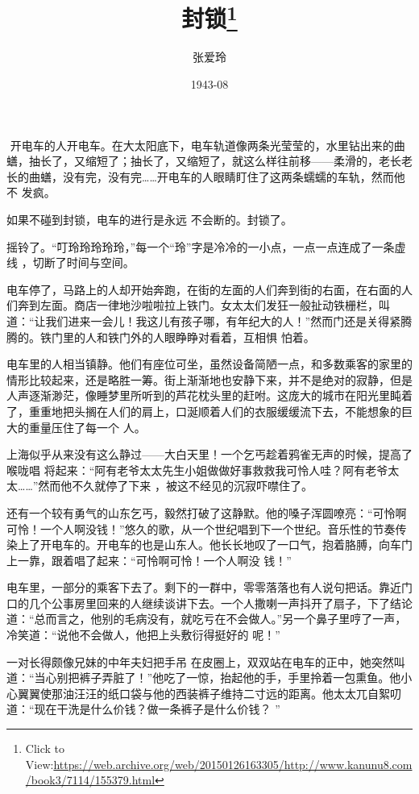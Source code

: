 \documentclass{article}
\title{封锁\footnote{Click to View:\url{https://web.archive.org/web/20150126163305/http://www.kanunu8.com/book3/7114/155379.html}}}
\author{张爱玲}
\date{1943-08}
\begin{document}

\maketitle


\Large

﻿	
    开电车的人开电车。在大太阳底下，电车轨道像两条光莹莹的，水里钻出来的曲蟮，抽长了，又缩短了；抽长了，又缩短了，就这么样往前移——柔滑的，老长老长的曲蟮，没有完，没有完……开电车的人眼睛盯住了这两条蠕蠕的车轨，然而他不
发疯。 

    如果不碰到封锁，电车的进行是永远
不会断的。封锁了。 

    摇铃了。“叮玲玲玲玲玲，”每一个“玲”字是冷冷的一小点，一点一点连成了一条虚线
，切断了时间与空间。 

\newpage

    电车停了，马路上的人却开始奔跑，在街的左面的人们奔到街的右面，在右面的人们奔到左面。商店一律地沙啦啦拉上铁门。女太太们发狂一般扯动铁栅栏，叫道：“让我们进来一会儿！我这儿有孩子哪，有年纪大的人！”然而门还是关得紧腾腾的。铁门里的人和铁门外的人眼睁睁对看着，互相惧
怕着。 

    电车里的人相当镇静。他们有座位可坐，虽然设备简陋一点，和多数乘客的家里的情形比较起来，还是略胜一筹。街上渐渐地也安静下来，并不是绝对的寂静，但是人声逐渐渺茫，像睡梦里所听到的芦花枕头里的赶咐。这庞大的城市在阳光里盹着了，重重地把头搁在人们的肩上，口涎顺着人们的衣服缓缓流下去，不能想象的巨大的重量压住了每一个
人。 


 

    上海似乎从来没有这么静过——大白天里！一个乞丐趁着鸦雀无声的时候，提高了喉咙唱
\newpage
将起来：“阿有老爷太太先生小姐做做好事救救我可怜人哇？阿有老爷太太……”然而他不久就停了下来
，被这不经见的沉寂吓噤住了。 

    还有一个较有勇气的山东乞丐，毅然打破了这静默。他的嗓子浑圆嘹亮：“可怜啊可怜！一个人啊没钱！”悠久的歌，从一个世纪唱到下一个世纪。音乐性的节奏传染上了开电车的。开电车的也是山东人。他长长地叹了一口气，抱着胳膊，向车门上一靠，跟着唱了起来：“可怜啊可怜！一个人啊没
钱！” 

    电车里，一部分的乘客下去了。剩下的一群中，零零落落也有人说句把话。靠近门口的几个公事房里回来的人继续谈讲下去。一个人撒喇一声抖开了扇子，下了结论道：“总而言之，他别的毛病没有，就吃亏在不会做人。”另一个鼻子里哼了一声，冷笑道：“说他不会做人，他把上头敷衍得挺好的
呢！” 

    一对长得颇像兄妹的中年夫妇把手吊
\newpage
在皮圈上，双双站在电车的正中，她突然叫道：“当心别把裤子弄脏了！”他吃了一惊，抬起他的手，手里拎着一包熏鱼。他小心翼翼使那油汪汪的纸口袋与他的西装裤子维持二寸远的距离。他太太兀自絮叨道：“现在干洗是什么价钱？做一条裤子是什么价钱？
” 
\end{document}
